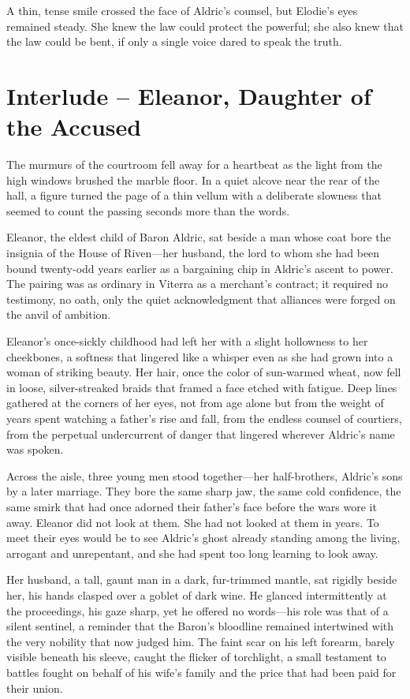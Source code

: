 \documentclass[11pt,twoside]{book}
\begin{document}
A thin, tense smile crossed the face of Aldric's counsel, but Elodie's eyes remained steady.  She knew the law could protect the powerful; she also knew that the law could be bent, if only a single voice dared to speak the truth.

\newpage

\section*{Interlude -- Eleanor, Daughter of the Accused}

The murmurs of the courtroom fell away for a heartbeat as the light from the high windows brushed the marble floor. In a quiet alcove near the rear of the hall, a figure turned the page of a thin vellum with a deliberate slowness that seemed to count the passing seconds more than the words.

Eleanor, the eldest child of Baron Aldric, sat beside a man whose coat bore the insignia of the House of Riven---her husband, the lord to whom she had been bound twenty-odd years earlier as a bargaining chip in Aldric's ascent to power. The pairing was as ordinary in Viterra as a merchant's contract; it required no testimony, no oath, only the quiet acknowledgment that alliances were forged on the anvil of ambition.

Eleanor's once-sickly childhood had left her with a slight hollowness to her cheekbones, a softness that lingered like a whisper even as she had grown into a woman of striking beauty. Her hair, once the color of sun-warmed wheat, now fell in loose, silver-streaked braids that framed a face etched with fatigue. Deep lines gathered at the corners of her eyes, not from age alone but from the weight of years spent watching a father's rise and fall, from the endless counsel of courtiers, from the perpetual undercurrent of danger that lingered wherever Aldric's name was spoken.

Across the aisle, three young men stood together---her half-brothers, Aldric's sons by a later marriage. They bore the same sharp jaw, the same cold confidence, the same smirk that had once adorned their father's face before the wars wore it away. Eleanor did not look at them. She had not looked at them in years. To meet their eyes would be to see Aldric's ghost already standing among the living, arrogant and unrepentant, and she had spent too long learning to look away.

Her husband, a tall, gaunt man in a dark, fur-trimmed mantle, sat rigidly beside her, his hands clasped over a goblet of dark wine. He glanced intermittently at the proceedings, his gaze sharp, yet he offered no words---his role was that of a silent sentinel, a reminder that the Baron's bloodline remained intertwined with the very nobility that now judged him. The faint scar on his left forearm, barely visible beneath his sleeve, caught the flicker of torchlight, a small testament to battles fought on behalf of his wife's family and the price that had been paid for their union.
\end{document}
